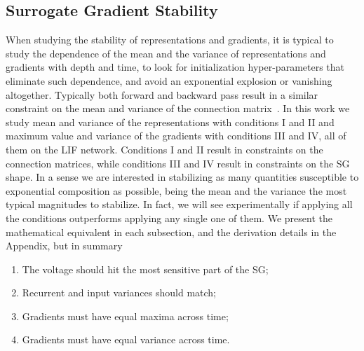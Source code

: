 \subsection{Surrogate Gradient Stability}
When studying the stability of representations and gradients, it is typical to study the dependence of the mean and the variance of representations and gradients with depth and time, to look for initialization hyper-parameters that eliminate such dependence, and avoid an exponential explosion or vanishing altogether. Typically both forward and backward pass result in a similar constraint on the mean and variance of the connection matrix~\cite{glorot2010understanding, he2015delving}. In this work we study mean and variance of the representations with conditions I and II and maximum value and variance of the gradients with conditions III and IV, all of them on the LIF network. Conditions I and II result in constraints on the connection matrices, while conditions III and IV result in constraints on the SG shape.
In a sense we are interested in stabilizing as many quantities susceptible to exponential composition as possible, being the mean and the variance the most typical magnitudes to stabilize. In fact, we will see experimentally if applying all the conditions outperforms applying any single one of them.
We present the mathematical equivalent in each subsection, and the derivation details in the Appendix, but in summary
\begin{enumerate}[label=\Roman*]
\itemsep0em 
    \item The voltage should hit the most sensitive part of the SG;
    \item Recurrent and input variances should match;
    \item Gradients must have equal maxima across time;
    \item Gradients must have equal variance across time.
\end{enumerate}


